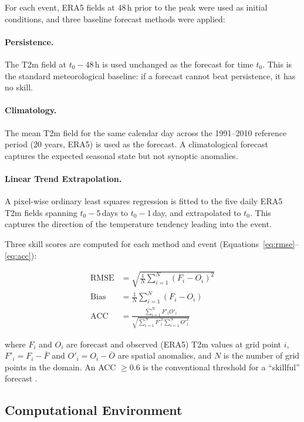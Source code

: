 \documentclass[12pt,a4paper]{article}
\begin{document}
For each event, ERA5 fields at 48\,h prior to the peak were used as
initial conditions, and three baseline forecast methods were applied:

\paragraph{Persistence.}
The T2m field at $t_0 - 48$\,h is used unchanged as the forecast for
time $t_0$. This is the standard meteorological baseline: if a forecast
cannot beat persistence, it has no skill.

\paragraph{Climatology.}
The mean T2m field for the same calendar day across the 1991--2010
reference period (20 years, ERA5) is used as the forecast. A climatological
forecast captures the expected seasonal state but not synoptic anomalies.

\paragraph{Linear Trend Extrapolation.}
A pixel-wise ordinary least squares regression is fitted to the five
daily ERA5 T2m fields spanning $t_0 - 5$\,days to $t_0 - 1$\,day, and
extrapolated to $t_0$. This captures the direction of the temperature
tendency leading into the event.

Three skill scores are computed for each method and event
(Equations~\ref{eq:rmse}--\ref{eq:acc}):

\begin{align}
  \text{RMSE} &= \sqrt{\frac{1}{N}\sum_{i=1}^{N}(F_i - O_i)^2}
  \label{eq:rmse} \\[6pt]
  \text{Bias} &= \frac{1}{N}\sum_{i=1}^{N}(F_i - O_i)
  \label{eq:bias} \\[6pt]
  \text{ACC}  &= \frac{\sum_{i=1}^{N} F'_i O'_i}
                      {\sqrt{\sum_{i=1}^{N} F'^2_i \sum_{i=1}^{N} O'^2_i}}
  \label{eq:acc}
\end{align}

where $F_i$ and $O_i$ are forecast and observed (ERA5) T2m values at
grid point $i$, $F'_i = F_i - \bar{F}$ and $O'_i = O_i - \bar{O}$ are
spatial anomalies, and $N$ is the number of grid points in the domain.
An ACC $\geq 0.6$ is the conventional threshold for a ``skillful''
forecast \citep{wilks2011}.

\subsection{Computational Environment}
\end{document}
